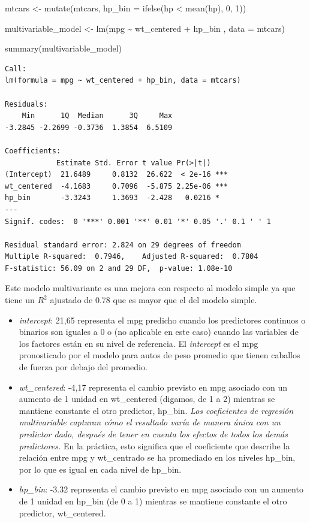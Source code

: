 \documentclass[
]{book}
\newenvironment{Shaded}{\begin{snugshade}}{\end{snugshade}}
\newcommand{\AttributeTok}[1]{\textcolor[rgb]{0.77,0.63,0.00}{#1}}
\newcommand{\DecValTok}[1]{\textcolor[rgb]{0.00,0.00,0.81}{#1}}
\newcommand{\FunctionTok}[1]{\textcolor[rgb]{0.00,0.00,0.00}{#1}}
\newcommand{\NormalTok}[1]{#1}
\newcommand{\OtherTok}[1]{\textcolor[rgb]{0.56,0.35,0.01}{#1}}
\newcommand{\SpecialCharTok}[1]{\textcolor[rgb]{0.00,0.00,0.00}{#1}}
\begin{document}
\begin{Shaded}
\begin{Highlighting}[]
\NormalTok{mtcars }\OtherTok{\textless{}{-}} \FunctionTok{mutate}\NormalTok{(mtcars, }\AttributeTok{hp\_bin =} \FunctionTok{ifelse}\NormalTok{(hp }\SpecialCharTok{\textless{}} \FunctionTok{mean}\NormalTok{(hp), }\DecValTok{0}\NormalTok{, }\DecValTok{1}\NormalTok{))}

\NormalTok{multivariable\_model }\OtherTok{\textless{}{-}} \FunctionTok{lm}\NormalTok{(mpg }\SpecialCharTok{\textasciitilde{}}\NormalTok{ wt\_centered }\SpecialCharTok{+}\NormalTok{ hp\_bin , }\AttributeTok{data =}\NormalTok{ mtcars)}

\FunctionTok{summary}\NormalTok{(multivariable\_model)}
\end{Highlighting}
\end{Shaded}

\begin{verbatim}
Call:
lm(formula = mpg ~ wt_centered + hp_bin, data = mtcars)

Residuals:
    Min      1Q  Median      3Q     Max 
-3.2845 -2.2699 -0.3736  1.3854  6.5109 

Coefficients:
            Estimate Std. Error t value Pr(>|t|)    
(Intercept)  21.6489     0.8132  26.622  < 2e-16 ***
wt_centered  -4.1683     0.7096  -5.875 2.25e-06 ***
hp_bin       -3.3243     1.3693  -2.428   0.0216 *  
---
Signif. codes:  0 '***' 0.001 '**' 0.01 '*' 0.05 '.' 0.1 ' ' 1

Residual standard error: 2.824 on 29 degrees of freedom
Multiple R-squared:  0.7946,    Adjusted R-squared:  0.7804 
F-statistic: 56.09 on 2 and 29 DF,  p-value: 1.08e-10
\end{verbatim}

Este modelo multivariante es una mejora con respecto al modelo simple ya que tiene un \(R^2\) ajustado de 0.78 que es mayor que el del modelo simple.

\begin{itemize}
\item
  \emph{intercept}: 21,65 representa el mpg predicho cuando los predictores continuos o binarios son iguales a 0 o (no aplicable en este caso) cuando las variables de los factores están en su nivel de referencia. El \emph{intercept} es el mpg pronosticado por el modelo para autos de peso promedio que tienen caballos de fuerza por debajo del promedio.
\item
  \emph{wt\_centered}: -4,17 representa el cambio previsto en mpg asociado con un aumento de 1 unidad en wt\_centered (digamos, de 1 a 2) mientras se mantiene constante el otro predictor, hp\_bin. \emph{Los coeficientes de regresión multivariable capturan cómo el resultado varía de manera única con un predictor dado, después de tener en cuenta los efectos de todos los demás predictores.} En la práctica, esto significa que el coeficiente que describe la relación entre mpg y wt\_centrado se ha promediado en los niveles hp\_bin, por lo que es igual en cada nivel de hp\_bin.
\item
  \emph{hp\_bin}: -3.32 representa el cambio previsto en mpg asociado con un aumento de 1 unidad en hp\_bin (de 0 a 1) mientras se mantiene constante el otro predictor, wt\_centered.
\end{itemize}
\end{document}
